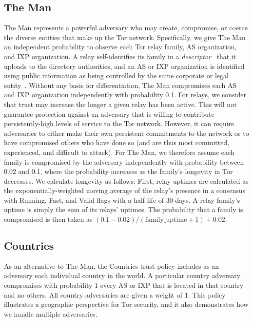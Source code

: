 \documentclass[conference]{styles/IEEEtran}
\begin{document}
\subsection{\textsf{The Man}}
\textsf{The Man} represents a powerful adversary who may create, compromise, or coerce
the diverse entities that make up the Tor network. Specifically, we give \textsf{The Man}
an independent probability to observe each Tor relay family, AS organization, and IXP
organization. A relay self-identifies its family in a \emph{descriptor}~\cite{dir-spec} that it
uploads to the directory authorities, and
an AS or IXP organization is identified using public information as being controlled by the same
corporate or legal entity~\cite{Cai12b,ccs2013-usersrouted}.
Without any basis for differentiation, \textsf{The Man} compromises each AS and IXP organization
independently with probability 0.1. For relays, we consider that trust
may increase the longer a given relay has been active. This will not
guarantee protection against an adversary that is willing to
contribute persistently-high levels of service to the Tor network. However,
it can require adversaries to either make their own persistent
commitments to the network or to have compromised others who
have done so (and are thus most committed, experienced, and difficult to attack).
For \textsf{The Man}, we therefore assume each family
is compromised by the adversary independently with probability between
0.02 and 0.1, where the probability increases as the family's
longevity in Tor decreases. We calculate
longevity as follows: First, relay uptimes are calculated as the exponentially-weighted moving
average of the relay's presence in a consensus with Running, Fast, and Valid
flags with a half-life of 30 days.  A relay family's uptime is simply the sum
of its relays' uptimes. The probability that a family is compromised
is then taken as $(0.1-0.02)/(\mbox{family\_uptime}+1) + 0.02$.

\subsection{\textsf{Countries}}
As an alternative to \textsf{The Man}, the \textsf{Countries} trust policy includes as an
adversary each individual country in the world. A particular country
adversary compromises with probability 1 every AS or IXP that is located in that country
and no others. All country adversaries are given a weight of 1. This policy
illustrates a geographic perspective for Tor security, and it also demonstrates
how we handle multiple adversaries. 
\end{document}
